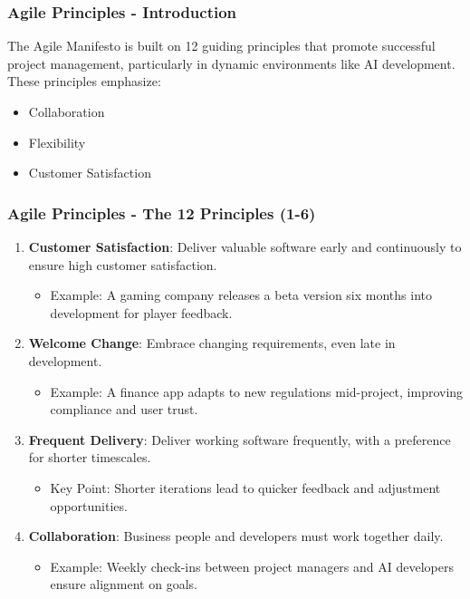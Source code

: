 \documentclass{beamer}
\begin{document}
\begin{frame}[fragile]
    \frametitle{Agile Principles - Introduction}
    The Agile Manifesto is built on 12 guiding principles that promote successful project management, particularly in dynamic environments like AI development. These principles emphasize:
    \begin{itemize}
        \item Collaboration
        \item Flexibility
        \item Customer Satisfaction
    \end{itemize}
\end{frame}

\begin{frame}[fragile]
    \frametitle{Agile Principles - The 12 Principles (1-6)}
    \begin{enumerate}
        \item \textbf{Customer Satisfaction}: Deliver valuable software early and continuously to ensure high customer satisfaction.
            \begin{itemize}
                \item Example: A gaming company releases a beta version six months into development for player feedback.
            \end{itemize}
        \item \textbf{Welcome Change}: Embrace changing requirements, even late in development.
            \begin{itemize}
                \item Example: A finance app adapts to new regulations mid-project, improving compliance and user trust.
            \end{itemize}
        \item \textbf{Frequent Delivery}: Deliver working software frequently, with a preference for shorter timescales.
            \begin{itemize}
                \item Key Point: Shorter iterations lead to quicker feedback and adjustment opportunities.
            \end{itemize}
        \item \textbf{Collaboration}: Business people and developers must work together daily.
            \begin{itemize}
                \item Example: Weekly check-ins between project managers and AI developers ensure alignment on goals.

\end{itemize}
\end{enumerate}
\end{frame}
\end{document}
